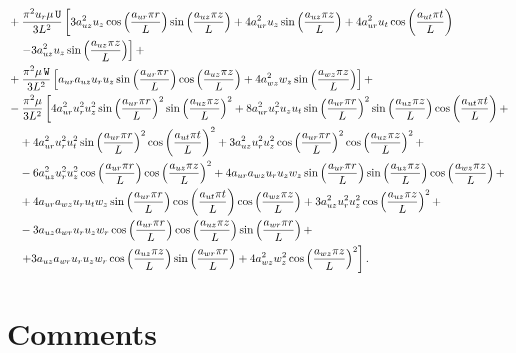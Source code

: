 \documentclass[10pt]{article}
\newcommand{\U}{\,\mathtt{U}}
\newcommand{\W}{\,\mathtt{W}}
\begin{document}
\begin{equation}
 \begin{split}
 \displaystyle
&+\dfrac{\pi^2 u_r \mu \U}{3L^2}\left[3 a_{uz}^2 u_z \cos\left(\dfrac{a_{ur} \pi r}{L}\right) \sin\left(\dfrac{a_{uz} \pi z}{L}\right)+4 a_{ur}^2 u_z \sin\left(\dfrac{a_{uz} \pi z}{L}\right)+4 a_{ur}^2 u_t \cos\left(\dfrac{a_{ut} \pi t}{L}\right)\right.\\
  &\quad\left.-3 a_{uz}^2 u_z \sin\left(\dfrac{a_{uz} \pi z}{L}\right)\right] + \\
&+\dfrac{\pi^2 \mu \W}{3L^2} \left[ a_{ur} a_{uz} u_r u_z \sin\left(\dfrac{a_{ur} \pi r}{L}\right) \cos\left(\dfrac{a_{uz} \pi z}{L}\right)+4 a_{wz}^2 w_z \sin\left(\dfrac{a_{wz} \pi z}{L}\right)\right] + \\
&-\dfrac{\pi^2 \mu}{3L^2} \left[4 a_{ur}^2 u_r^2 u_z^2 \sin\left(\dfrac{a_{ur} \pi r}{L}\right)^2 \sin\left(\dfrac{a_{uz} \pi z}{L}\right)^2+8 a_{ur}^2 u_r^2 u_z u_t \sin\left(\dfrac{a_{ur} \pi r}{L}\right)^2 \sin\left(\dfrac{a_{uz} \pi z}{L}\right) \cos\left(\dfrac{a_{ut} \pi t}{L}\right)+\right.\\
  &\quad+4 a_{ur}^2 u_r^2 u_t^2 \sin\left(\dfrac{a_{ur} \pi r}{L}\right)^2 \cos\left(\dfrac{a_{ut} \pi t}{L}\right)^2+3 a_{uz}^2 u_r^2 u_z^2 \cos\left(\dfrac{a_{ur} \pi r}{L}\right)^2 \cos\left(\dfrac{a_{uz} \pi z}{L}\right)^2+\\
  &\quad-6 a_{uz}^2 u_r^2 u_z^2 \cos\left(\dfrac{a_{ur} \pi r}{L}\right) \cos\left(\dfrac{a_{uz} \pi z}{L}\right)^2+4 a_{ur} a_{wz} u_r u_z w_z \sin\left(\dfrac{a_{ur} \pi r}{L}\right) \sin\left(\dfrac{a_{uz} \pi z}{L}\right) \cos\left(\dfrac{a_{wz} \pi z}{L}\right)+\\
  &\quad+4 a_{ur} a_{wz} u_r u_t w_z \sin\left(\dfrac{a_{ur} \pi r}{L}\right) \cos\left(\dfrac{a_{ut} \pi t}{L}\right) \cos\left(\dfrac{a_{wz} \pi z}{L}\right)+3 a_{uz}^2 u_r^2 u_z^2 \cos\left(\dfrac{a_{uz} \pi z}{L}\right)^2+\\
  &\quad-3 a_{uz} a_{wr} u_r u_z w_r \cos\left(\dfrac{a_{ur} \pi r}{L}\right) \cos\left(\dfrac{a_{uz} \pi z}{L}\right) \sin\left(\dfrac{a_{wr} \pi r}{L}\right)+\\
  &\quad\left.+3 a_{uz} a_{wr} u_r u_z w_r \cos\left(\dfrac{a_{uz} \pi z}{L}\right) \sin\left(\dfrac{a_{wr} \pi r}{L}\right)+4 a_{wz}^2 w_z^2 \cos\left(\dfrac{a_{wz} \pi z}{L}\right)^2\right] .
\end{split}
\end{equation}



\section{Comments}
\end{document}
